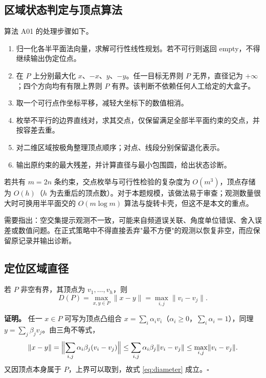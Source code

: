 \subsection{区域状态判定与顶点算法}

算法 A01 的处理步骤如下。

\begin{enumerate}[label=(\arabic*),leftmargin=2.2em]
  \item 归一化各半平面法向量，求解可行性线性规划。若不可行则返回 empty，不得继续输出伪定位点。
  \item 在 $P$ 上分别最大化 $x$、$-x$、$y$、$-y$。任一目标无界则 $P$ 无界，直径记为 $+\infty$；四个方向均有有限上界则 $P$ 有界。该判断不依赖任何人工给定的大盒子。
  \item 取一个可行点作坐标平移，减轻大坐标下的数值相消。
  \item 枚举不平行的边界直线对，求其交点，仅保留满足全部半平面约束的交点，并按容差去重。
  \item 对二维区域按极角整理顶点顺序；对点、线段分别保留退化表示。
  \item 输出原约束的最大残差，并计算直径与最小包围圆，给出状态诊断。
\end{enumerate}

若共有 $m=2n$ 条约束，交点枚举与可行性检验的复杂度为 $O(m^3)$，顶点存储为 $O(h)$（$h$ 为去重后的顶点数）。对于本题规模，该做法易于审查；观测数量很大时可换用半平面交的 $O(m\log m)$ 算法与旋转卡壳，但这不是本文的重点。

需要指出：空交集提示观测不一致，可能来自频道误关联、角度单位错误、舍入误差或数值问题。在正式策略中不得直接丢弃"最不方便"的观测以恢复非空，而应保留原记录并输出诊断。

\subsection{定位区域直径}

若 $P$ 非空有界，其顶点为 $v_1,\dots,v_h$，则
\begin{equation}
  D(P)=\max_{x,y\in P}\lVert x-y\rVert=\max_{i,j}\lVert v_i-v_j\rVert .
  \label{eq:diameter}
\end{equation}

\textbf{证明。} 任一 $x\in P$ 可写为顶点凸组合 $x=\sum_i\alpha_iv_i$（$\alpha_i\ge0$，$\sum_i\alpha_i=1$），同理 $y=\sum_j\beta_jv_j$。由三角不等式，
\begin{equation}
  \lVert x-y\rVert
  =\Bigl\lVert\sum_{i,j}\alpha_i\beta_j(v_i-v_j)\Bigr\rVert
  \le\sum_{i,j}\alpha_i\beta_j\lVert v_i-v_j\rVert
  \le\max_{i,j}\lVert v_i-v_j\rVert .
\end{equation}
又因顶点本身属于 $P$，上界可以取到，故式 \eqref{eq:diameter} 成立。$\square$

